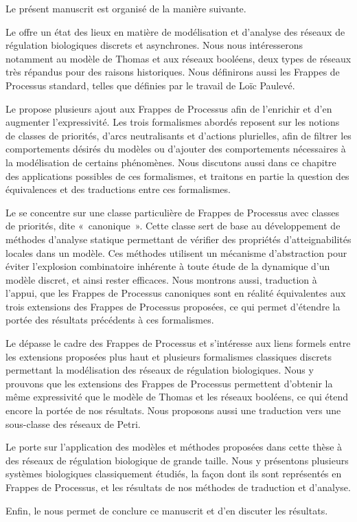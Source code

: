 Le présent manuscrit est organisé de la manière suivante.

Le  offre un état des lieux en matière de modélisation et d'analyse
des réseaux de régulation biologiques discrets et asynchrones.
Nous nous intéresserons notamment au modèle de Thomas et aux réseaux booléens,
deux types de réseaux très répandus pour des raisons historiques.
Nous définirons aussi les Frappes de Processus standard,
telles que définies par le travail de Loïc Paulevé.

Le  propose plusieurs ajout aux Frappes de Processus afin de l'enrichir
et d'en augmenter l'expressivité.
Les trois formalismes abordés reposent sur les notions de classes de priorités,
d'arcs neutralisants et d'actions plurielles,
afin de filtrer les comportements désirés du modèles
ou d'ajouter des comportements nécessaires à la modélisation de certains phénomènes.
Nous discutons aussi dans ce chapitre des applications possibles de ces formalismes,
et traitons en partie la question des équivalences et des traductions entre ces formalismes.

Le  se concentre sur une classe particulière de Frappes de Processus avec classes
de priorités, dite «~canonique~».
Cette classe sert de base au développement de méthodes d'analyse statique permettant
de vérifier des propriétés d'atteignabilités locales dans un modèle.
Ces méthodes utilisent un mécanisme d'abstraction pour éviter l'explosion combinatoire
inhérente à toute étude de la dynamique d'un modèle discret, et ainsi rester efficaces.
Nous montrons aussi, traduction à l'appui,
que les Frappes de Processus canoniques sont en réalité équivalentes
aux trois extensions des Frappes de Processus proposées,
ce qui permet d'étendre la portée des résultats précédents à ces formalismes.

Le  dépasse le cadre des Frappes de Processus et s'intéresse aux liens
formels entre les extensions proposées plus haut et plusieurs formalismes classiques discrets
permettant la modélisation des réseaux de régulation biologiques.
Nous y prouvons que les extensions des Frappes de Processus permettent d'obtenir la même
expressivité que le modèle de Thomas et les réseaux booléens,
ce qui étend encore la portée de nos résultats.
Nous proposons aussi une traduction vers une sous-classe des réseaux de Petri.

Le  porte sur l'application des modèles et méthodes proposées
dans cette thèse à des réseaux de régulation biologique de grande taille.
Nous y présentons plusieurs systèmes biologiques classiquement étudiés,
la façon dont ils sont représentés en Frappes de Processus,
et les résultats de nos méthodes de traduction et d'analyse.

Enfin, le  nous permet de conclure ce manuscrit
et d'en discuter les résultats.
